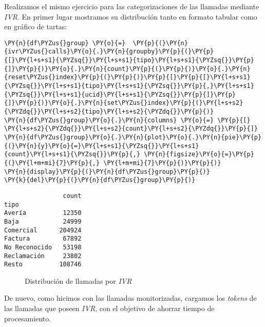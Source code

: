     Realizamos el mismo ejercicio para las categorizaciones de las llamadas mediante \textit{IVR}. En
primer lugar mostramos su distribución tanto en formato tabular como en gráfico de tartas:
\vspace{0.5cm}
    \begin{tcolorbox}[breakable, size=fbox, boxrule=1pt, pad at break*=1mm,colback=cellbackground, colframe=cellborder]
\begin{Verbatim}[commandchars=\\\{\}]
\PY{n}{df\PYZus{}group} \PY{o}{=}  \PY{p}{(}\PY{n}{ivr\PYZus{}calls}\PY{o}{.}\PY{n}{groupby}\PY{p}{(}\PY{p}{[}\PY{l+s+s1}{\PYZsq{}}\PY{l+s+s1}{tipo}\PY{l+s+s1}{\PYZsq{}}\PY{p}{]}\PY{p}{)}\PY{o}{.}\PY{n}{count}\PY{p}{(}\PY{p}{)}\PY{o}{.}\PY{n}{reset\PYZus{}index}\PY{p}{(}\PY{p}{)}\PY{p}{[}\PY{p}{[}\PY{l+s+s1}{\PYZsq{}}\PY{l+s+s1}{tipo}\PY{l+s+s1}{\PYZsq{}}\PY{p}{,}\PY{l+s+s1}{\PYZsq{}}\PY{l+s+s1}{ucid}\PY{l+s+s1}{\PYZsq{}}\PY{p}{]}\PY{p}{]}\PY{p}{)}\PY{o}{.}\PY{n}{set\PYZus{}index}\PY{p}{(}\PY{l+s+s2}{\PYZdq{}}\PY{l+s+s2}{tipo}\PY{l+s+s2}{\PYZdq{}}\PY{p}{)}
\PY{n}{df\PYZus{}group}\PY{o}{.}\PY{n}{columns} \PY{o}{=} \PY{p}{[} \PY{l+s+s2}{\PYZdq{}}\PY{l+s+s2}{count}\PY{l+s+s2}{\PYZdq{}}\PY{p}{]}
\PY{n}{df\PYZus{}group}\PY{o}{.}\PY{n}{plot}\PY{o}{.}\PY{n}{pie}\PY{p}{(}\PY{n}{y}\PY{o}{=}\PY{l+s+s1}{\PYZsq{}}\PY{l+s+s1}{count}\PY{l+s+s1}{\PYZsq{}}\PY{p}{,} \PY{n}{figsize}\PY{o}{=}\PY{p}{(}\PY{l+m+mi}{7}\PY{p}{,} \PY{l+m+mi}{7}\PY{p}{)}\PY{p}{)}
\PY{n}{display}\PY{p}{(}\PY{n}{df\PYZus{}group}\PY{p}{)}
\PY{k}{del}\PY{p}{(}\PY{n}{df\PYZus{}group}\PY{p}{)}
\end{Verbatim}
\end{tcolorbox}

    
    \begin{verbatim}
                count
tipo                 
Avería          12350
Baja            24999
Comercial      204924
Factura         67892
No Reconocido   53198
Reclamación     23802
Resto          108746
    \end{verbatim}

    
\begin{figure}[!ht]
	\centering
    \caption{Distribución de llamadas por \textit{IVR}}
    \label{fig:distivr}
\end{figure}
    
    De nuevo, como hicimos con las llamadas monitorizadas, cargamos los \textit{tokens} de las llamadas que poseen \textit{IVR}, con el objetivo de ahorrar tiempo de procesamiento.
    
